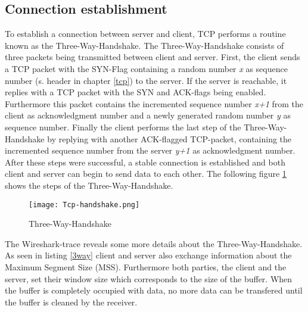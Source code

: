 \subsection{Connection establishment}
\label{con-est}
To establish a connection between server and client, TCP performs a routine known as the Three-Way-Handshake. The Three-Way-Handshake consists of three packets being transmitted between client and server. First, the client sends a TCP packet with the SYN-Flag containing a random number \textit{x} as sequence number (s. header in chapter \ref{tcp}) to the server. If the server is reachable, it replies with a TCP packet with the SYN and ACK-flags being enabled. Furthermore this packet contains the incremented sequence number \textit{x+1} from the client as acknowledgment number and a newly generated random number \textit{y} as sequence number. Finally the client performs the last step of the Three-Way-Handshake by replying with another ACK-flagged TCP-packet, containing the incremented sequence number from the server \textit{y+1} as acknowledgment number.\\
After these steps were successful, a stable connection is established and both client and server can begin to send data to each other. The following figure \ref{three-way-handshake} shows the steps of the Three-Way-Handshake.
\begin{figure}[H]
	\centering
	\texttt{[image: Tcp-handshake.png]}
	\caption{Three-Way-Handshake}
	\label{three-way-handshake}
\end{figure}
The Wireshark-trace reveals some more details about the Three-Way-Handshake. As seen in listing \ref{3way} client and server also exchange information about the Maximum Segment Size (MSS).
Furthermore both parties, the client and the server, set their window size which corresponds to
the size of the buffer. When the buffer is completely occupied with data, no more data can be transfered until the buffer is cleaned by the receiver.

